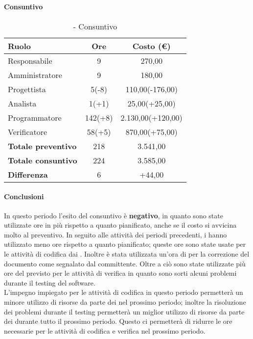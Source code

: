\documentclass[./PianoDiProgetto.tex]{subfiles}
\begin{document}
\paragraph{Consuntivo}	
\begin{table}[H]
		\centering

		\begin{tabular}{l * {2}{c}}
			\toprule
			\textbf{Ruolo} & \textbf{Ore} & \textbf{Costo (\euro{})} \\
			\midrule
			Responsabile & 9    &  270,00 \\
			Amministratore  & 9    &  180,00 \\
			Progettista  & 5(-8)   &  110,00(-176,00) \\
			Analista & 1(+1)    &  25,00(+25,00) \\
			Programmatore  & 142(+8)    &  2.130,00(+120,00) \\
			Verificatore  & 58(+5)    &  870,00(+75,00) \\
			\midrule
			\textbf{Totale preventivo}  & 218   &  3.541,00 \\
			\textbf{Totale consuntivo}  & 224   &  3.585,00 \\
			\midrule
			\textbf{Differenza}  & 6  &  +44,00 \\
			\bottomrule
		\end{tabular}
		\caption{\PerC{} - Consuntivo}
	\end{table}
	\paragraph{Conclusioni}
	In questo periodo l'esito del consuntivo è \textbf{negativo}, in quanto sono state utilizzate ore in più rispetto a quanto pianificato, anche se il costo si avvicina molto al preventivo. In seguito alle attività dei periodi precedenti, i \PJP{} hanno utilizzato meno ore rispetto a quanto pianificato; queste ore sono state usate per le attività di codifica dai \PRP{}. Inoltre è stata utilizzata un'ora di \AN{} per la correzione del documento \ARdoc{} come segnalato dal committente. Oltre a ciò sono state utilizzate più ore del previsto per le attività di verifica in quanto sono sorti alcuni problemi durante il testing del software.\\
L'impegno impiegato per le attività di codifica in questo periodo permetterà un minore utilizzo  di risorse da parte dei \PRP{} nel prossimo periodo; inoltre la risoluzione dei problemi durante il testing permetterà un miglior utilizzo di risorse da parte dei \VERP{} durante tutto il prossimo periodo. Questo ci permetterà di ridurre le ore necessarie per le attività di codifica e verifica nel prossimo periodo.
\end{document}

